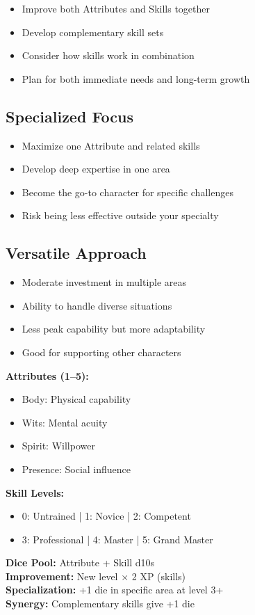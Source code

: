 \documentclass[11pt,twoside,openany]{book}
\begin{document}
\begin{itemize}
\item Improve both Attributes and Skills together
\item Develop complementary skill sets
\item Consider how skills work in combination
\item Plan for both immediate needs and long-term growth
\end{itemize}

\subsection*{Specialized Focus}

\begin{itemize}
\item Maximize one Attribute and related skills
\item Develop deep expertise in one area
\item Become the go-to character for specific challenges
\item Risk being less effective outside your specialty
\end{itemize}

\subsection*{Versatile Approach}

\begin{itemize}
\item Moderate investment in multiple areas
\item Ability to handle diverse situations
\item Less peak capability but more adaptability
\item Good for supporting other characters
\end{itemize}

\begin{tcolorbox}[colback=gray!5!white, colframe=gray!75!black, title=Attributes and Skills Quick Reference, fonttitle=\bfseries]
\textbf{Attributes (1–5):}
\begin{itemize}
\item Body: Physical capability
\item Wits: Mental acuity
\item Spirit: Willpower
\item Presence: Social influence
\end{itemize}

\textbf{Skill Levels:}
\begin{itemize}
\item 0: Untrained | 1: Novice | 2: Competent
\item 3: Professional | 4: Master | 5: Grand Master
\end{itemize}

\textbf{Dice Pool:} Attribute + Skill d10s\\
\textbf{Improvement:} New level × 2 XP (skills)\\
\textbf{Specialization:} +1 die in specific area at level 3+\\
\textbf{Synergy:} Complementary skills give +1 die
\end{tcolorbox}
\end{document}
